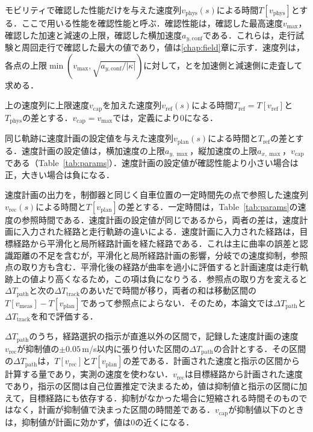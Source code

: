 \begin{description}[leftmargin=2\zw]
  \item[$T_{\mathrm{phys}}$（確認性能による基準時間）] モビリティで確認した性能だけを与えた速度列$v_{\mathrm{phys}}(s)$による時間$T[v_{\mathrm{phys}}]$とする．ここで用いる性能を確認性能と呼ぶ．確認性能は，確認した最高速度$v_{\max}$，確認した加速と減速の上限，確認した横加速度$a_{y,\mathrm{conf}}$である．これらは，走行試験と周回走行で確認した最大の値であり，値は\ref{chap:field}章に示す．速度列は，各点の上限$\min(v_{\max},\sqrt{a_{y,\mathrm{conf}}/|\kappa|})$に対して，とを加速側と減速側に走査して求める．
  \item[$\Delta T_{\mathrm{cap}}$（上限速度による時間差）] 上の速度列に上限速度$v_{\mathrm{cap}}$を加えた速度列$v_{\mathrm{ref}}(s)$による時間$T_{\mathrm{ref}}=T[v_{\mathrm{ref}}]$と$T_{\mathrm{phys}}$の差とする．$v_{\mathrm{cap}}=v_{\max}$では，定義により0になる．
  \item[$\Delta T_{\mathrm{plan}}$（速度計画の設定値による時間差）] 同じ軌跡に速度計画の設定値を与えた速度列$v_{\mathrm{plan}}(s)$による時間と$T_{\mathrm{ref}}$の差とする．速度計画の設定値は，横加速度の上限$a_{y,\max}$，縦加速度の上限$a_{x,\max}$，$v_{\mathrm{cap}}$である（Table~\ref{tab:params}）．速度計画の設定値が確認性能より小さい場合は正，大きい場合は負になる．
  \item[$\Delta T_{\mathrm{path}}$（速度計画に入力された経路による時間差）] 速度計画の出力を，制御器と同じく自車位置の一定時間先の点で参照した速度列$v_{\mathrm{rec}}(s)$による時間と$T[v_{\mathrm{plan}}]$の差とする．一定時間は，Table~\ref{tab:params}の速度の参照時間である．速度計画の設定値が同じであるから，両者の差は，速度計画に入力された経路と走行軌跡の違いによる．速度計画に入力された経路は，目標経路から平滑化と局所経路計画を経た経路である．これは主に曲率の誤差と認識距離の不足を含むが，平滑化と局所経路計画の影響，分岐での速度抑制，参照点の取り方も含む．平滑化後の経路が曲率を過小に評価すると計画速度は走行軌跡上の値より高くなるため，この項は負になりうる．参照点の取り方を変えると$\Delta T_{\mathrm{path}}$と次の$\Delta T_{\mathrm{track}}$のあいだで時間が移り，両者の和は移動区間の$T[v_{\mathrm{meas}}]-T[v_{\mathrm{plan}}]$であって参照点によらない．そのため，本論文では$\Delta T_{\mathrm{path}}$と$\Delta T_{\mathrm{track}}$を和で評価する．
  \item[$\Delta T_{\mathrm{branch}}$（分岐での速度抑制による時間差）] $\Delta T_{\mathrm{path}}$のうち，経路選択の指示が直進以外の区間で，記録した速度計画の速度$v_{\mathrm{rec}}$が抑制値の$\pm 0.05$\,m/s以内に張り付いた区間の$\Delta T_{\mathrm{path}}$の合計とする．その区間の$\Delta T_{\mathrm{path}}$は，$T[v_{\mathrm{rec}}]$と$T[v_{\mathrm{plan}}]$の差である．計画された速度と指示の区間から計算する量であり，実測の速度を使わない．$v_{\mathrm{rec}}$は目標経路から計画された速度であり，指示の区間は自己位置推定で決まるため，値は抑制値と指示の区間に加えて，目標経路にも依存する．抑制がなかった場合に短縮される時間そのものではなく，計画が抑制値で決まった区間の時間差である．$v_{\mathrm{cap}}$が抑制値以下のときは，抑制値が計画に効かず，値は0の近くになる．

\end{description}
